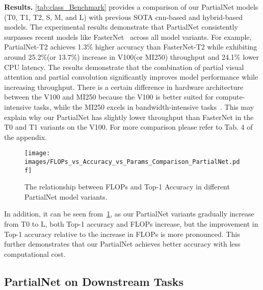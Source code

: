 {\bf Results.} \cref{tab:class_Benchmark} provides a comparison of our PartialNet models (T0, T1, T2, S, M, and L) with previous SOTA cnn-based and hybrid-based models. The experimental results demonstrate that PartialNet consistently surpasses recent models like FasterNet~\cite{Chen2023} across all model variants. For example, PartialNet-T2 achieves 1.3\% higher accuracy than FasterNet-T2 while exhibiting around 25.2\%(or 13.7\%) increase in V100(or MI250) throughput and 24.1\% lower CPU latency. The results demonstrate that the combination of partial visual attention and partial convolution significantly improves model performance while increasing throughput. There is a certain difference in hardware architecture between the V100 and MI250 because the V100 is better suited for compute-intensive tasks, while the MI250 excels in bandwidth-intensive tasks~\cite{Halbiniak2024}. This may explain why our PartialNet has slightly lower throughput than FasterNet in the T0 and T1 variants on the V100. For more comparison please refer to Tab. 4 of the appendix. 

\begin{figure}[ht]
  \centering
  \texttt{[image: images/FLOPs\_vs\_Accuracy\_vs\_Params\_Comparison\_PartialNet.pdf]}
  \caption{The relationship between FLOPs and Top-1 Accuracy in different PartialNet model variants.}
  \label{fig:FLOPs_vs_Accuracy}
\end{figure}

In addition, it can be seen from~\cref{fig:FLOPs_vs_Accuracy}, as our PartialNet variants gradually increase from T0 to L, both Top-1 accuracy and FLOPs increase, but the improvement in Top-1 accuracy relative to the increase in FLOPs is more pronounced. This further demonstrates that our PartialNet achieves better accuracy with less computational cost.

\subsection{PartialNet on Downstream Tasks}

